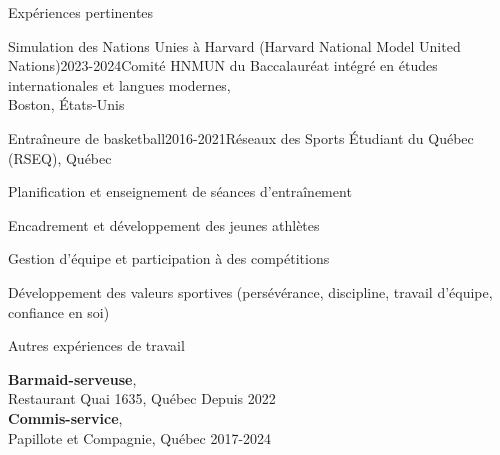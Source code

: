 \documentclass{resume} %
\begin{document}
\begin{rSection}{Expériences pertinentes}
\begin{rSubsection}{Simulation des Nations Unies à Harvard (Harvard National Model United \\Nations)}{2023-2024}{Comité HNMUN du Baccalauréat intégré en études internationales et langues modernes, \\Boston, États-Unis}{}
\end{rSubsection}


\begin{rSubsection}{Entraîneure de basketball}{2016-2021}{Réseaux des Sports Étudiant du Québec (RSEQ), Québec}{}

\item Planification et enseignement de séances d'entraînement
\item Encadrement et développement des jeunes athlètes    
\item Gestion d'équipe et participation à des compétitions
\item Développement des valeurs sportives (persévérance, discipline, travail d'équipe, confiance en soi)

\end{rSubsection}

\end{rSection} 


\begin{rSection}{Autres expériences de travail} \itemsep -3pt  

{\textbf{Barmaid-serveuse}, \\Restaurant Quai 1635, Québec} \hfill Depuis 2022 \\   
{\textbf{Commis-service}, \\Papillote et Compagnie, Québec} \hfill 2017-2024 \\     

\end{rSection}  
 
  
\end{document}
